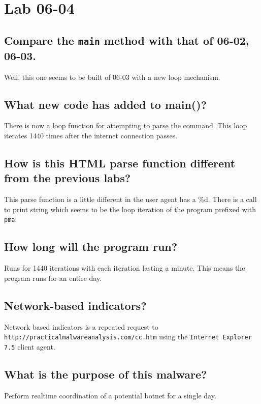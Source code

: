\documentclass[11pt]{article}
\begin{document}
\section{Lab 06-04}
\label{sec-5}
\subsection{Compare the \texttt{main} method with that of 06-02, 06-03.}
\label{sec-5-1}
Well, this one seems to be built of 06-03 with a new loop mechanism. 

\subsection{What new code has added to main()?}
\label{sec-5-2}
There is now a loop function for attempting to parse the command. This loop
iterates 1440 times after the internet connection passes.   
\subsection{How is this HTML parse function different from the previous labs?}
\label{sec-5-3}
This parse function is a little different in the user agent has a \%d. There
is a call to print string which seems to be the loop iteration of the
program prefixed with \texttt{pma}.
\subsection{How long will the program run?}
\label{sec-5-4}
Runs for 1440 iterations with each iteration lasting a minute. This means the
program runs for an entire day.
\subsection{Network-based indicators?}
\label{sec-5-5}
Network based indicators is a repeated request to
\texttt{http://practicalmalwareanalysis.com/cc.htm} using the \texttt{Internet Explorer
7.5} client agent.
\subsection{What is the purpose of this malware?}
\label{sec-5-6}
Perform realtime coordination of a potential botnet for a single day.
\end{document}
